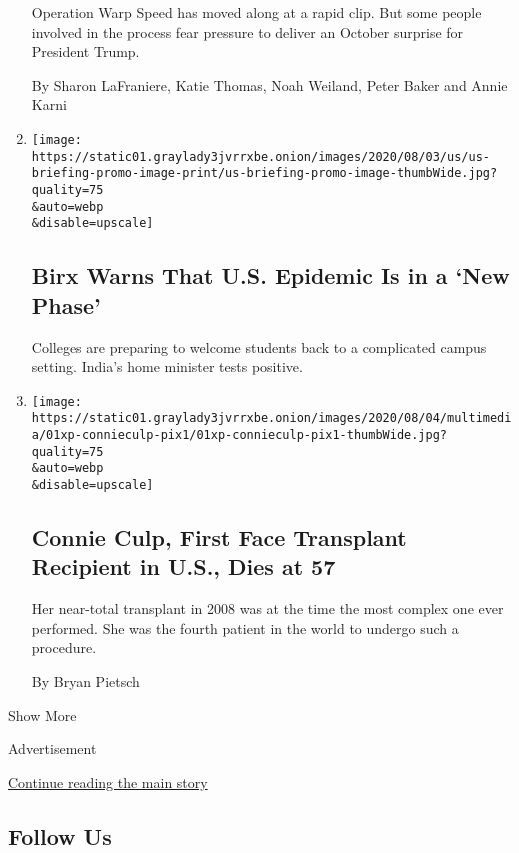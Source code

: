 \begin{enumerate}
  Operation Warp Speed has moved along at a rapid clip. But some people
  involved in the process fear pressure to deliver an October surprise
  for President Trump.

  By Sharon LaFraniere, Katie Thomas, Noah Weiland, Peter Baker and
  Annie Karni
\item
  \href{/2020/08/02/world/coronavirus-covid-19.html}{}

  \texttt{[image: https://static01.graylady3jvrrxbe.onion/images/2020/08/03/us/us-briefing-promo-image-print/us-briefing-promo-image-thumbWide.jpg?quality=75\\\&auto=webp\\\&disable=upscale]}

  \hypertarget{birx-warns-that-us-epidemic-is-in-a-new-phase}{%
  \subsection{Birx Warns That U.S. Epidemic Is in a `New
  Phase'}\label{birx-warns-that-us-epidemic-is-in-a-new-phase}}

  Colleges are preparing to welcome students back to a complicated
  campus setting. India's home minister tests positive.
\item
  \href{/2020/08/01/us/Connie-culp-dead-face-transplant.html}{}

  \texttt{[image: https://static01.graylady3jvrrxbe.onion/images/2020/08/04/multimedia/01xp-connieculp-pix1/01xp-connieculp-pix1-thumbWide.jpg?quality=75\\\&auto=webp\\\&disable=upscale]}

  \hypertarget{connie-culp-first-face-transplant-recipient-in-us-dies-at-57}{%
  \subsection{Connie Culp, First Face Transplant Recipient in U.S., Dies
  at
  57}\label{connie-culp-first-face-transplant-recipient-in-us-dies-at-57}}

  Her near-total transplant in 2008 was at the time the most complex one
  ever performed. She was the fourth patient in the world to undergo
  such a procedure.

  By Bryan Pietsch
\end{enumerate}

Show More

Advertisement

\protect\hyperlink{after-mid3}{Continue reading the main story}

\hypertarget{follow-us}{%
\subsection{Follow Us}\label{follow-us}}

